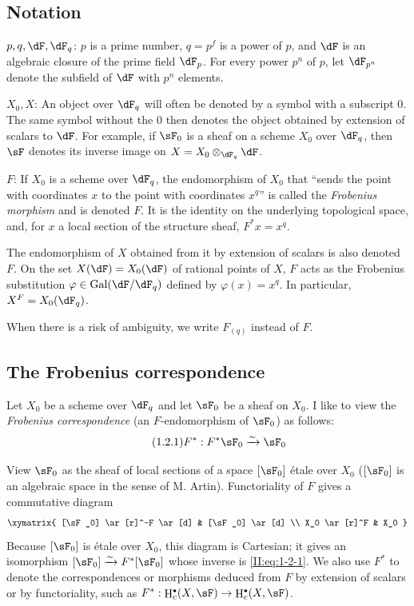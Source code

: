 \documentclass[12pt,oneside,english]{smfbook}
\DeclareMathOperator{\gal}{Gal}
\DeclareMathOperator{\h}{H}
\newcommand{\iso}{\xrightarrow\sim}
\let\oldbullet\bullet
\renewcommand{\bullet}{\textnormal{\tiny$\oldbullet$}}
\begin{document}
\subsection{Notation}\label{II:1-1}

$p,q,\dF,\dF_q$: $p$ is a prime number, $q=p^f$ is a power of $p$, and $\dF$ is an algebraic closure of the prime field $\dF_p$. For every power $p^n$ of $p$, let $\dF_{p^n}$ denote the subfield of $\dF$ with $p^n$ elements.

$X_0,X$: An object over $\dF_q$ will often be denoted by a symbol with a subscript $0$. The same symbol without the $0$ then denotes the object obtained by extension of scalars to $\dF$. For example, if $\sF_0$ is a sheaf on a scheme $X_0$ over $\dF_q$, then $\sF$ denotes its inverse image on $X=X_0\otimes_{\dF_q}\dF$.

$F$: If $X_0$ is a scheme over $\dF_q$, the endomorphism of $X_0$ that ``sends the point with coordinates $x$ to the point with coordinates $x^q$'' is called the \emph{Frobenius morphism} and is denoted $F$. It is the identity on the underlying topological space, and, for $x$ a local section of the structure sheaf, $F^*x=x^q$.

The endomorphism of $X$ obtained from it by extension of scalars is also denoted $F$. On the set $X(\dF)=X_0(\dF)$ of rational points of $X$, $F$ acts as the Frobenius substitution $\varphi\in\gal(\dF/\dF_q)$ defined by $\varphi(x)=x^q$. In particular, $X^F=X_0(\dF_q)$.

When there is a risk of ambiguity, we write $F_{(q)}$ instead of $F$.

\subsection{The Frobenius correspondence}\label{II:1-2}

Let $X_0$ be a scheme over $\dF_q$ and let $\sF_0$ be a sheaf on $X_0$. I like to view the \emph{Frobenius correspondence} (an $F$-endomorphism of $\sF_0$) as follows:
\begin{equation*}\tag{1.2.1}\label{II:eq:1-2-1}
  F^* : F^*\sF_0 \iso \sF_0
\end{equation*}

View $\sF_0$ as the sheaf of local sections of a space $[\sF_0]$ étale over $X_0$ ($[\sF_0]$ is an algebraic space in the sense of M. Artin). Functoriality of $F$ gives a commutative diagram
\[\xymatrix{
  [\sF_0] \ar[r]^-F \ar[d]
    & [\sF_0] \ar[d] \\
  X_0 \ar[r]^F
    & X_0
}\]
Because $[\sF_0]$ is étale over $X_0$, this diagram is Cartesian; it gives an isomorphism $[\sF_0]\iso F^*[\sF_0]$ whose inverse is \eqref{II:eq:1-2-1}. We also use $F^*$ to denote the correspondences or morphisms deduced from $F$ by extension of scalars or by functoriality, such as $F^*:\h_c^\bullet(X,\sF)\to\h_c^\bullet(X,\sF)$.
\end{document}
